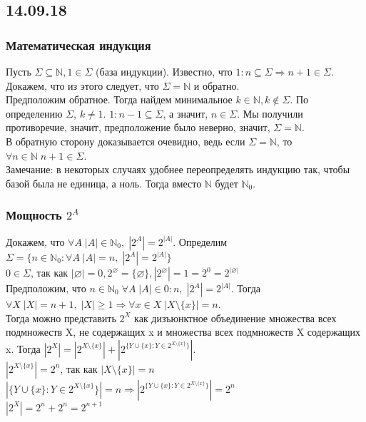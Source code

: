 \subsection{14.09.18}
\subsubsection{Математическая индукция}
Пусть $\Sigma \subseteq \mathbb{N}, 1 \in \Sigma$ (база индукции). Известно, что $1:n \subseteq \Sigma \Rightarrow n + 1 \in \Sigma$. Докажем, что из этого следует, что $\Sigma = \mathbb{N}$ и обратно.\\
Предположим обратное. Тогда найдем минимальное $k \in \mathbb{N}, k \not\in \Sigma$. По определению $\Sigma$, $k \not= 1$. $1:n - 1 \subseteq \Sigma$, а значит, $n \in \Sigma$. Мы получили противоречие, значит, предположение было неверно, значит, $\Sigma = \mathbb{N}$.\\
В обратную сторону доказывается очевидно, ведь если $\Sigma = \mathbb{N}$, то $\forall n \in \mathbb{N} \; n + 1 \in \Sigma$.\\
Замечание: в некоторых случаях удобнее переопределять индукцию так, чтобы базой была не единица, а ноль. Тогда вместо $\mathbb{N}$ будет $\mathbb{N}_0$.
\subsubsection{Мощность $2^A$}
Докажем, что $\forall A \; |A| \in \mathbb{N}_0 , \; |2^A| = 2^{|A|}$. Определим $\Sigma = \{n \in \mathbb{N}_0 : \forall A \; |A| = n , \; |2^A| = 2^{|A|}\}$\\
$0 \in \Sigma$, так как $|\varnothing| = 0, 2^{\varnothing} = \{\varnothing\}, |2^{\varnothing}| = 1 = 2^0 = 2^{|\varnothing|}$ \\
Предположим, что $n \in \mathbb{N}_0 \; \forall A \; |A| \in 0:n , \; |2^A| = 2^{|A|}$. Тогда $\forall X \;  |X| = n + 1 , \; |X| \geq 1 \Rightarrow \forall x \in X \; |X \setminus \{x\}| = n$. \\
Тогда можно представить $2^X$ как дизъюнктное объединение множества всех подмножеств X, не содержащих x и множества всех подмножеств X содержащих x. Тогда $|2^X| = |2^{X \setminus \{x\}}| + |2^{\{Y \cup \{x\} : Y \in 2^{X \setminus \{x\}}\}}|$. \\
$|2^{X \setminus \{x\}}| = 2^n$, так как $|X \setminus \{x\}| = n$ \\
$|\{Y \cup \{x\} : Y \in 2^{X \setminus \{x\}}\}| = n \Rightarrow |2^{\{Y \cup \{x\} : Y \in 2^{X \setminus \{x\}}\}}| = 2^n$ \\
$|2^X| = 2^n + 2^n = 2^{n + 1}$
